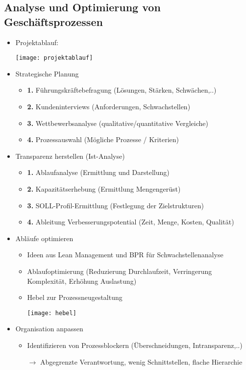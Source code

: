 \subsection{Analyse und Optimierung von Geschäftsprozessen}
\begin{itemize}
\item Projektablauf:
\item[] \texttt{[image: projektablauf]}


\item Strategische Planung
	\begin{itemize}
	\item \textbf{1.} Führungskräftebefragung (Lösungen, Stärken, Schwächen,..)
	\item \textbf{2.} Kundeninterviews (Anforderungen, Schwachstellen)
	\item \textbf{3.} Wettbewerbsanalyse (qualitative/quantitative Vergleiche)
	\item \textbf{4.} Prozessauswahl (Mögliche Prozesse / Kriterien)
	\end{itemize}
	
\item Transparenz herstellen (Ist-Analyse)
	\begin{itemize}
	\item \textbf{1.} Ablaufanalyse (Ermittlung und Darstellung)
	\item \textbf{2.} Kapazitätserhebung (Ermittlung Mengengerüst)
	\item \textbf{3.} SOLL-Profil-Ermittlung (Festlegung der Zielstrukturen) 
	\item \textbf{4.} Ableitung Verbesserungspotential (Zeit, Menge, Kosten, Qualität)
	\end{itemize}
	
\item Abläufe optimieren
	\begin{itemize}
	\item Ideen aus Lean Management und BPR für Schwachstellenanalyse
	\item Ablaufoptimierung (Reduzierung Durchlaufzeit, Verringerung Komplexität, Erhöhung Auslastung)
	\item Hebel zur Prozessneugestaltung
	\item[] \texttt{[image: hebel]}
	\end{itemize}

\item Organisation anpassen
	\begin{itemize}
	\item Identifizieren von Prozessblockern (Überschneidungen, Intransparenz,..)
	\item[$\rightarrow$] Abgegrenzte Verantwortung, wenig Schnittstellen, flache Hierarchie
	\end{itemize}
	

\end{itemize}
